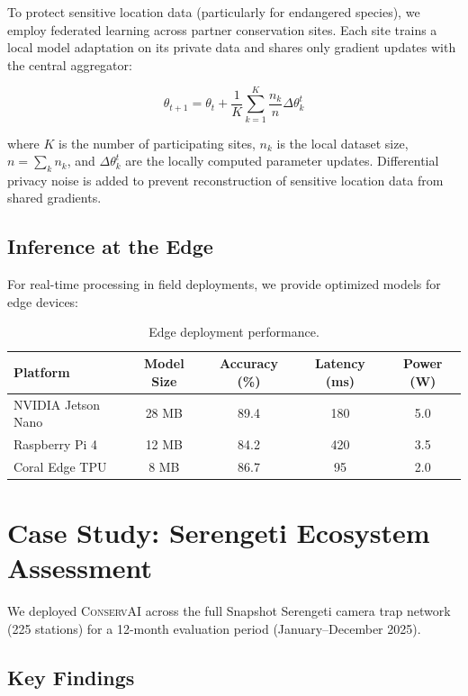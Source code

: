 \documentclass[11pt,letterpaper]{article}
\newcommand{\ConservAI}{\textsc{ConservAI}}
\begin{document}
To protect sensitive location data (particularly for endangered species), we employ federated learning across partner conservation sites. Each site trains a local model adaptation on its private data and shares only gradient updates with the central aggregator:

\begin{equation}
\theta_{t+1} = \theta_t + \frac{1}{K} \sum_{k=1}^{K} \frac{n_k}{n} \Delta \theta_k^t
\end{equation}

where $K$ is the number of participating sites, $n_k$ is the local dataset size, $n = \sum_k n_k$, and $\Delta \theta_k^t$ are the locally computed parameter updates. Differential privacy noise is added to prevent reconstruction of sensitive location data from shared gradients.

\subsection{Inference at the Edge}

For real-time processing in field deployments, we provide optimized models for edge devices:

\begin{table}[htbp]
\centering
\caption{Edge deployment performance.}
\label{tab:edge}
\begin{tabular}{lcccc}
\toprule
\textbf{Platform} & \textbf{Model Size} & \textbf{Accuracy (\%)} & \textbf{Latency (ms)} & \textbf{Power (W)} \\
\midrule
NVIDIA Jetson Nano & 28 MB & 89.4 & 180 & 5.0 \\
Raspberry Pi 4 & 12 MB & 84.2 & 420 & 3.5 \\
Coral Edge TPU & 8 MB & 86.7 & 95 & 2.0 \\
\bottomrule
\end{tabular}
\end{table}

\section{Case Study: Serengeti Ecosystem Assessment}

We deployed \ConservAI{} across the full Snapshot Serengeti camera trap network (225 stations) for a 12-month evaluation period (January--December 2025).

\subsection{Key Findings}
\end{document}
